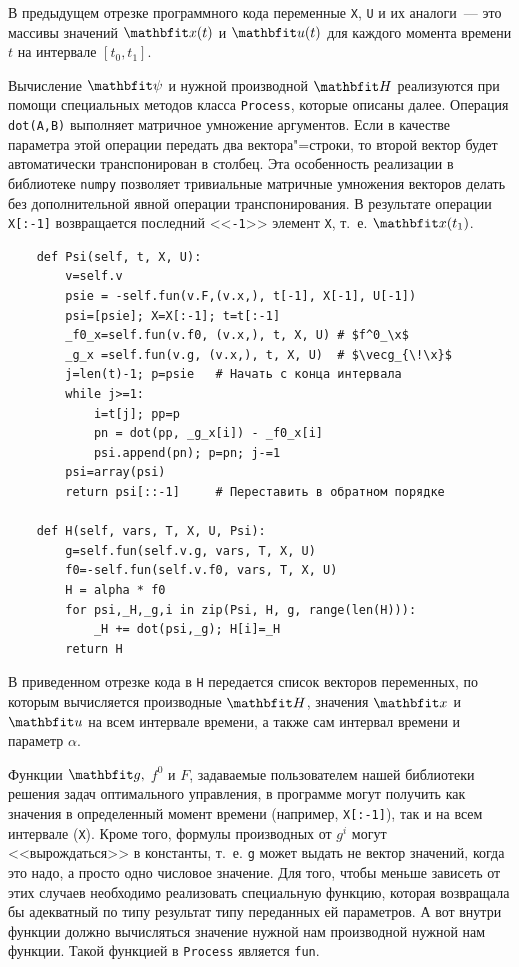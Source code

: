 \documentclass[a4paper,14pt, openany, twoside, draft]{extbook} %
\begin{document}
В предыдущем отрезке программного кода переменные \texttt{X}, \texttt{U} и их аналоги~--- это массивы значений $\vecx(t)$ и $\vecu(t)$ для каждого момента времени $t$ на интервале $[t_0,t_1]$.

Вычисление $\vecpsi$ и нужной производной $\vecH$ реализуются при помощи специальных методов класса \texttt{Process}, которые описаны далее.  Операция \texttt{dot(A,B)} выполняет матричное умножение аргументов.  Если в качестве параметра этой операции передать два вектора"=строки, то второй вектор будет автоматически транспонирован в столбец.  Эта особенность реализации в библиотеке \texttt{numpy} позволяет тривиальные матричные умножения векторов делать без дополнительной явной операции транспонирования.  В результате операции \texttt{X[:-1]} возвращается последний <<\texttt{-1}>> элемент \texttt{X}, т.~е. $\x(t_1)$.

\begin{verbatim}
    def Psi(self, t, X, U):
        v=self.v
        psie = -self.fun(v.F,(v.x,), t[-1], X[-1], U[-1])
        psi=[psie]; X=X[:-1]; t=t[:-1]
        _f0_x=self.fun(v.f0, (v.x,), t, X, U) # $f^0_\x$
        _g_x =self.fun(v.g, (v.x,), t, X, U)  # $\vecg_{\!\x}$
        j=len(t)-1; p=psie   # Начать с конца интервала
        while j>=1:
            i=t[j]; pp=p
            pn = dot(pp, _g_x[i]) - _f0_x[i]
            psi.append(pn); p=pn; j-=1
        psi=array(psi)
        return psi[::-1]     # Переставить в обратном порядке

    def H(self, vars, T, X, U, Psi):
        g=self.fun(self.v.g, vars, T, X, U)
        f0=-self.fun(self.v.f0, vars, T, X, U)
        H = alpha * f0
        for psi,_H,_g,i in zip(Psi, H, g, range(len(H))):
            _H += dot(psi,_g); H[i]=_H
        return H
\end{verbatim}

В приведенном отрезке кода в \texttt{H} передается список векторов переменных, по которым вычисляется производные $\vecH$, значения $\vecx$ и $\vecu$ на всем интервале времени, а также сам интервал времени и параметр $\alpha$.

Функции $\vecg,$ $f^0$ и $F$, задаваемые пользователем нашей библиотеки решения задач оптимального управления, в программе могут получить как значения в определенный момент времени (например, \texttt{X[:-1]}), так и на всем интервале (\texttt{X}).  Кроме того, формулы производных от $g^i$ могут <<вырождаться>> в константы, т.~е. \texttt{g} может выдать не вектор значений, когда это надо, а просто одно числовое значение.  Для того, чтобы меньше зависеть от этих случаев необходимо реализовать специальную функцию, которая возвращала бы адекватный по типу результат типу переданных ей параметров.  А вот внутри функции должно вычисляться значение нужной нам производной нужной нам функции.  Такой функцией в \texttt{Process} является \texttt{fun}.
\end{document}
